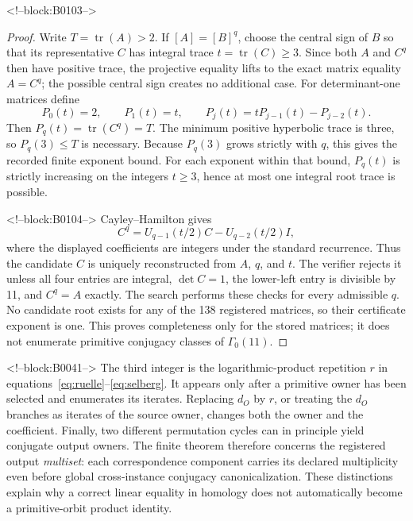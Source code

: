 \documentclass[11pt]{article}
\theoremstyle{definition}
\theoremstyle{remark}
\newcommand{\G}{\Gamma_0(11)}
\begin{document}
<!--block:B0103-->
\begin{proof}
Write $T=\operatorname{tr}(A)>2$. If $[A]=[B]^q$, choose the central sign of $B$ so that its representative $C$ has integral trace $t=\operatorname{tr}(C)\geq3$. Since both $A$ and $C^q$ then have positive trace, the projective equality lifts to the exact matrix equality $A=C^q$; the possible central sign creates no additional case. For determinant-one matrices define
\[
P_0(t)=2,\qquad P_1(t)=t,\qquad
P_j(t)=tP_{j-1}(t)-P_{j-2}(t).
\]
Then $P_q(t)=\operatorname{tr}(C^q)=T$. The minimum positive hyperbolic trace is three, so $P_q(3)\leq T$ is necessary. Because $P_q(3)$ grows strictly with $q$, this gives the recorded finite exponent bound. For each exponent within that bound, $P_q(t)$ is strictly increasing on the integers $t\geq3$, hence at most one integral root trace is possible.

<!--block:B0104-->
Cayley--Hamilton gives
\[
C^q=U_{q-1}(t/2)C-U_{q-2}(t/2)I,
\]
where the displayed coefficients are integers under the standard recurrence. Thus the candidate $C$ is uniquely reconstructed from $A$, $q$, and $t$. The verifier rejects it unless all four entries are integral, $\det C=1$, the lower-left entry is divisible by 11, and $C^q=A$ exactly. The search performs these checks for every admissible $q$. No candidate root exists for any of the 138 registered matrices, so their certificate exponent is one. This proves completeness only for the stored matrices; it does not enumerate primitive conjugacy classes of $\G$.
\end{proof}

<!--block:B0041-->
The third integer is the logarithmic-product repetition $r$ in equations~\eqref{eq:ruelle}--\eqref{eq:selberg}. It appears only after a primitive owner has been selected and enumerates its iterates. Replacing $d_O$ by $r$, or treating the $d_O$ branches as iterates of the source owner, changes both the owner and the coefficient. Finally, two different permutation cycles can in principle yield conjugate output owners. The finite theorem therefore concerns the registered output \emph{multiset}: each correspondence component carries its declared multiplicity even before global cross-instance conjugacy canonicalization. These distinctions explain why a correct linear equality in homology does not automatically become a primitive-orbit product identity.
\end{document}
